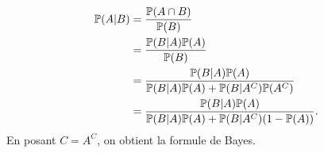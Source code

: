 {\begin{td-sol}[]
\begin{enumerate}
\begin{equation*}
                \begin{aligned}
                    \mathbb{P}(A|B)
                    &=\frac{\mathbb{P}(A\cap B)}{\mathbb{P}(B)}\\
                    &=\frac{\mathbb{P}(B|A)\mathbb{P}(A)}{\mathbb{P}(B)}\\
                    &=\frac{\mathbb{P}(B|A)\mathbb{P}(A)}{\mathbb{P}(B|A)\mathbb{P}(A)+\mathbb{P}(B|A^C)\mathbb{P}(A^C)}\\
                    &=\frac{\mathbb{P}(B|A)\mathbb{P}(A)}{\mathbb{P}(B|A)\mathbb{P}(A)+\mathbb{P}(B|A^C)(1-\mathbb{P}(A))}.
                \end{aligned}
            \end{equation*}
            En posant \(C=A^C\), on obtient la formule de Bayes.
        \end{enumerate}
    \end{td-sol}
}{}

